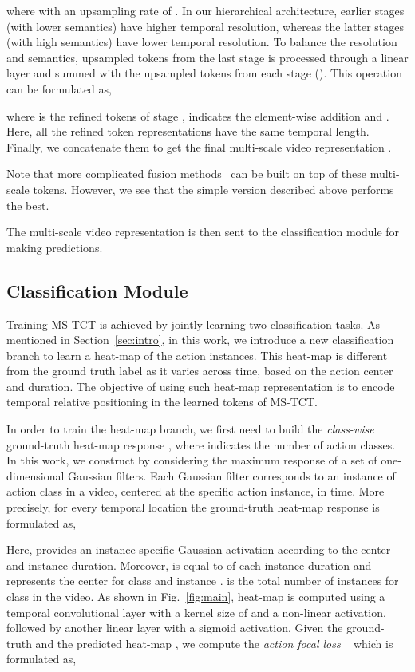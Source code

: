 \documentclass[10pt,twocolumn,letterpaper]{article}
\begin{document}
where  with an upsampling rate of .
In our hierarchical architecture, earlier stages (with lower semantics) have higher temporal resolution, whereas the latter stages (with high semantics) have lower temporal resolution.
To balance the resolution and semantics, upsampled tokens from the last stage  is processed through a linear layer and summed with the upsampled tokens from each stage (). 
This operation can be formulated as,

where  is the refined tokens of stage ,  indicates the element-wise addition and .
Here, all the refined token representations have the same temporal length.   
Finally, we concatenate them to get the final multi-scale video representation . 

Note that more complicated fusion methods~\cite{dai2021attentional,liu2018path} can be built on top of these multi-scale tokens. However, we see that the simple version described above performs the best. 

The multi-scale video representation  is then sent to the classification module for making predictions.

\subsection{Classification Module}
Training MS-TCT is achieved by jointly learning two classification tasks. 
As mentioned in Section~\ref{sec:intro}, in this work, we introduce a new classification branch to learn a heat-map of the action instances. 
This heat-map is different from the ground truth label as it varies across time, based on the action center and duration. The objective of using such heat-map representation is to encode temporal relative positioning in the learned tokens of MS-TCT.

In order to train the heat-map branch, we first need to build the \textit{class-wise} ground-truth heat-map response , where  indicates the number of action classes. In this work, we construct  by considering the maximum response of a set of one-dimensional Gaussian filters. Each Gaussian filter corresponds to an instance of action class in a video, centered at the specific action instance, in time. 
More precisely, for every temporal location  the ground-truth heat-map response is formulated as,


Here,  provides an instance-specific Gaussian activation according to the center and instance duration. Moreover,  is equal to  of each instance duration and  represents the center for class  and instance .  is the total number of instances for class  in the video.
As shown in Fig.~\ref{fig:main}, heat-map  is computed using a temporal convolutional layer with a kernel size of  and a non-linear activation, followed by another linear layer with a sigmoid activation. 
Given the ground-truth  and the predicted heat-map , we compute the \textit{action focal loss} ~\cite{zhou2019objects,lin2017focal} which is formulated as,
\end{document}
